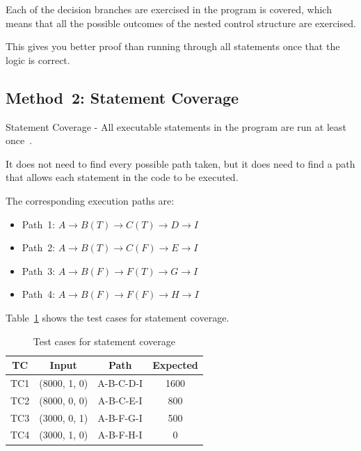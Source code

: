 \documentclass[conference]{IEEEtran}
\begin{document}
Each of the decision branches are exercised in the program is covered, which means that all the possible outcomes of the nested control structure are exercised.

This gives you better proof than running through all statements once that the logic is correct.



\subsection{Method~2: Statement Coverage}

Statement Coverage - All executable statements in the program are run at least once~\cite{nidhra2012}.

It does not need to find every possible path taken, but it does need to find a path that allows each statement in the code to be executed.



The corresponding execution paths are:

\begin{itemize}

\item Path~1: $A \to B(T) \to C(T) \to D \to I$

\item Path~2: $A \to B(T) \to C(F) \to E \to I$

\item Path~3: $A \to B(F) \to F(T) \to G \to I$

\item Path~4: $A \to B(F) \to F(F) \to H \to I$

\end{itemize}



Table~\ref{tab:stmt_tc} shows the test cases for statement coverage.



\begin{table}[!t]

\centering

\caption{Test cases for statement coverage}

\label{tab:stmt_tc}

\begin{tabular}{|c|c|c|c|}
\hline
\textbf{TC} & \textbf{Input} & \textbf{Path} & \textbf{Expected} \\
\hline
TC1 & (8000, 1, 0) & A-B-C-D-I & 1600 \\
TC2 & (8000, 0, 0) & A-B-C-E-I & 800 \\
TC3 & (3000, 0, 1) & A-B-F-G-I & 500 \\
TC4 & (3000, 1, 0) & A-B-F-H-I & 0 \\
\hline
\end{tabular}

\end{table}
\end{document}
